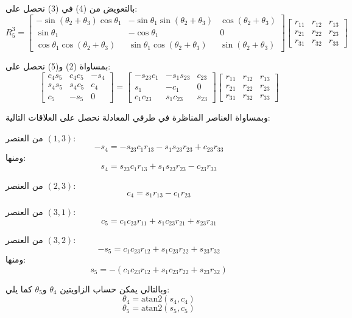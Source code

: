 بالتعويض من (4) في (3) نحصل على:
\begin{equation}
R_5^3 =
\begin{bmatrix}
- \sin(\theta_2+\theta_3)\cos\theta_1 &
- \sin\theta_1\sin(\theta_2+\theta_3) &
\cos(\theta_2+\theta_3)
\\
\sin\theta_1 & - \cos\theta_1 & 0
\\
\cos\theta_1\cos(\theta_2+\theta_3) &
\sin\theta_1\cos(\theta_2+\theta_3) &
\sin(\theta_2+\theta_3)
\end{bmatrix}
\begin{bmatrix}
r_{11} & r_{12} & r_{13} \\
r_{21} & r_{22} & r_{23} \\
r_{31} & r_{32} & r_{33}
\end{bmatrix}
\tag{5}
\end{equation}

بمساواة (2) و(5) نحصل على:
\[
\begin{bmatrix}
c_4 s_5 & c_4 c_5 & -s_4 \\
s_4 s_5 & s_4 c_5 & c_4 \\
c_5 & -s_5 & 0
\end{bmatrix}
=
\begin{bmatrix}
- s_{23}c_1 & - s_1 s_{23} & c_{23} \\
s_1 & - c_1 & 0 \\
c_1 c_{23} & s_1 c_{23} & s_{23}
\end{bmatrix}
\begin{bmatrix}
r_{11} & r_{12} & r_{13} \\
r_{21} & r_{22} & r_{23} \\
r_{31} & r_{32} & r_{33}
\end{bmatrix}
\]

وبمساواة العناصر المناظرة في طرفي المعادلة نحصل على العلاقات التالية:

من العنصر $(1,3)$:
\[
- s_4 = - s_{23} c_1 r_{13} - s_1 s_{23} r_{23} + c_{23} r_{33}
\]
ومنها:
\[
s_4 = s_{23} c_1 r_{13} + s_1 s_{23} r_{23} - c_{23} r_{33}
\]

من العنصر $(2,3)$:
\[
c_4 = s_1 r_{13} - c_1 r_{23}
\]

من العنصر $(3,1)$:
\[
c_5 = c_1 c_{23} r_{11} + s_1 c_{23} r_{21} + s_{23} r_{31}
\]

من العنصر $(3,2)$:
\[
- s_5 = c_1 c_{23} r_{12} + s_1 c_{23} r_{22} + s_{23} r_{32}
\]
ومنها:
\[
s_5 = - \left( c_1 c_{23} r_{12} + s_1 c_{23} r_{22} + s_{23} r_{32} \right)
\]

وبالتالي يمكن حساب الزاويتين $\theta_4$ و$\theta_5$ كما يلي:
\[
\theta_4 = \mathrm{atan2}(s_4, c_4)
\]
\[
\theta_5 = \mathrm{atan2}(s_5, c_5)
\]